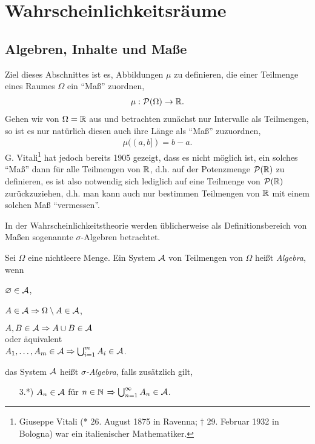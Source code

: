 \chapter{Wahrscheinlichkeitsräume}
\label{chap:1}

\section{Algebren, Inhalte und Maße}
\label{chap:1.a}

Ziel dieses Abschnittes ist es, Abbildungen $\mu$ zu definieren, die einer
Teilmenge eines Raumes $\Omega$ ein ``Maß'' zuordnen,
\begin{align*}
\mu: \PP(\Omega)\to\R.
\end{align*}
Gehen wir von $\Omega=\R$ aus und betrachten zunächst nur Intervalle als
Teilmengen, so ist es nur natürlich diesen auch ihre Länge als ``Maß''
zuzuordnen,
\begin{align*}
\mu((a,b]) = b-a.
\end{align*}
G. Vitali\footnote{Giuseppe Vitali (* 26. August 1875 in Ravenna; † 29. Februar
1932 in Bologna) war ein italienischer Mathematiker.} hat jedoch bereits 1905
gezeigt, dass es nicht möglich ist, ein solches ``Maß'' dann für alle
Teilmengen von $\R$, d.h. auf der Potenzmenge $\PP(\R)$ zu definieren, es ist
also notwendig sich lediglich auf eine Teilmenge von $\PP(\R)$ zurückzuziehen,
d.h. man kann auch nur bestimmen Teilmengen von $\R$ mit einem solchen Maß
``vermessen''.
\clearpage

In der Wahrscheinlichkeitstheorie werden üblicherweise als Definitionsbereich
von Maßen sogenannte $\sigma$-Algebren betrachtet. 

\begin{defn}
\label{defn:1.1}
Sei $\Omega$ eine nichtleere Menge. Ein System $\AA$ von Teilmengen von
$\Omega$ heißt \emph{Algebra}, wenn
\begin{defnenum}
  \item $\varnothing\in\AA$,
  \item $A\in \AA \Rightarrow \Omega\setminus A\in\AA$,
  \item $A,B\in\AA \Rightarrow A\cup B\in\AA$\\
  \qquad oder äquivalent\\
  $A_1,\ldots,A_m\in \AA \Rightarrow \bigcup_{i=1}^m A_i \in\AA$.
\end{defnenum}
das System $\AA$ heißt \emph{$\sigma$-Algebra}, falls zusätzlich gilt,
\begin{enumerate}
  \item[3.*)] $A_n\in\AA$ für $n\in\N$ $\Rightarrow
  \bigcup_{n=1}^\infty A_n\in\AA$.\fishhere
\end{enumerate}
\end{defn}


